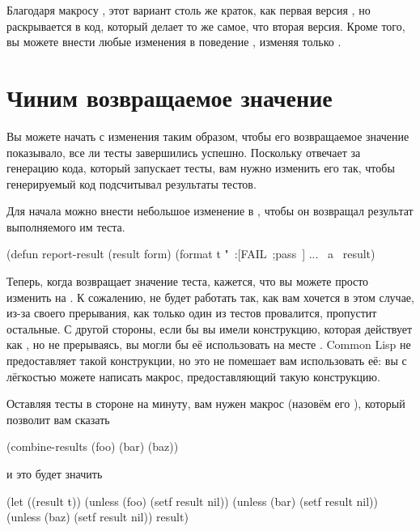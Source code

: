 Благодаря макросу , этот вариант столь же краток, как первая версия
, но раскрывается в код, который делает то же самое, что вторая версия. Кроме
того, вы можете внести любые изменения в поведение , изменяя только
.

\section{Чиним возвращаемое значение}

Вы можете начать с изменения  таким образом, чтобы его возвращаемое значение
показывало, все ли тесты завершились успешно. Поскольку  отвечает за генерацию
кода, который запускает тесты, вам нужно изменить его так, чтобы генерируемый код
подсчитывал результаты тестов.

Для начала можно внести небольшое изменение в , чтобы он возвращал
результат выполняемого им теста.

\begin{myverb}
(defun report-result (result form)
  (format t "~:[FAIL~;pass~] ... ~a~%
  result)
\end{myverb}

Теперь, когда  возвращает значение теста, кажется, что вы можете
просто изменить  на . К сожалению,  не будет работать так,
как вам хочется в этом случае, из-за своего прерывания, как только один из тестов
провалится,  пропустит остальные. С другой стороны, если бы вы имели
конструкцию, которая действует как , но не прерываясь, вы могли бы её
использовать на месте . Common Lisp не предоставляет такой конструкции, но это
не помешает вам использовать её: вы с лёгкостью можете написать макрос, предоставляющий
такую конструкцию.

Оставляя тесты в стороне на минуту, вам нужен макрос (назовём его ),
который позволит вам сказать

\begin{myverb}
(combine-results
  (foo)
  (bar)
  (baz))
\end{myverb}

и это будет значить

\begin{myverb}
(let ((result t))
  (unless (foo) (setf result nil))
  (unless (bar) (setf result nil))
  (unless (baz) (setf result nil))
  result)
\end{myverb}

